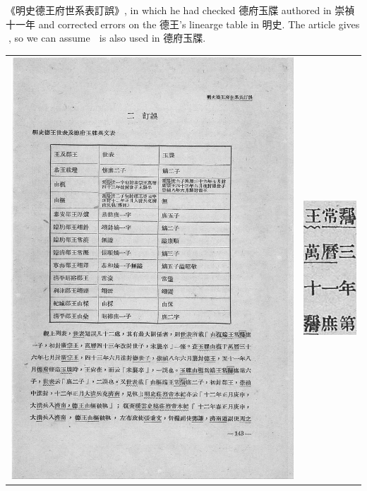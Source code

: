 \documentclass{article}
\begin{document}
《明史德王府世系表訂誤》\cite{明史德王府世系表訂誤}, in which he had checked 德府玉牒 authored in 崇禎十一年 and corrected errors on the 德王's linearge table in 明史. The article gives 﫡, so we can assume 﫠 is also used in 德府玉牒.

\begin{center}
    \begin{tabular}{ c c }
        \includegraphics[height=.9\textheight]{5-000.jpg} & \includegraphics{5-000-crop.png}
    \end{tabular}
    \label{mingshidewangfu}
\end{center}
\end{document}
